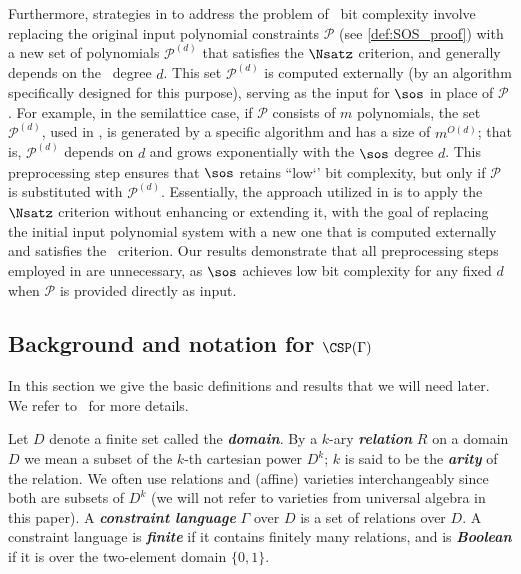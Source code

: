 \documentclass[11pt]{article}
\begin{document}
Furthermore, strategies in \cite{BharathiM21,BulatovRSTOC22,BulatovARXIV21, Mastrolilli21TALG} to address the problem of \sos\ bit complexity involve replacing the original input polynomial constraints \(\mathcal{P}\) (see \cref{def:SOS_proof}) with a new set of polynomials $\mathcal{P}^{(d)}$ that satisfies the \(\Nsatz\) criterion, and generally depends on the \sos\ degree \(d\). This set $\mathcal{P}^{(d)}$ is computed externally (by an algorithm specifically designed for this purpose), serving as the input for \(\sos\) in place of $\mathcal{P}$. For example, in the semilattice case, if $\mathcal{P}$ consists of $m$ polynomials, the set $\mathcal{P}^{(d)}$, used in \cite{BulatovRSTOC22,Mastrolilli21TALG}, is generated by a specific algorithm and has a size of \( m^{O(d)} \); that is, $\mathcal{P}^{(d)}$ depends on \( d \) and grows exponentially with the \(\sos\) degree \( d \). This preprocessing step ensures that \(\sos\) retains ``low`' bit complexity, but only if $\mathcal{P}$ is substituted with $\mathcal{P}^{(d)}$. Essentially, the approach utilized in \cite{BharathiM21,BulatovRSTOC22,BulatovARXIV21, Mastrolilli21TALG} is to apply the \(\Nsatz\) criterion without enhancing or extending it, with the goal of replacing the initial input polynomial system with a new one that is computed externally and satisfies the \Nsatz\ criterion.
%
Our results demonstrate that all preprocessing steps employed in \cite{BharathiM21,BulatovRSTOC22,Mastrolilli21TALG} are unnecessary, as \(\sos\) achieves low bit complexity for any fixed \( d \) when \(\mathcal{P}\) is provided directly as input.



\subsection[Background and notation for CSP's]{Background and notation for \(\CSP(\Gamma)\)}\label{sect:CSP_IMP_background}
In this section we give the basic definitions and results that we will need later.
We refer to~\cite{barto_et_al:DFU:2017:6959,2017dfu7,Chen09, Mastrolilli21TALG, BulatovRSTOC22} for more details.

Let $D$ denote a finite set called the  \textbf{\emph{domain}}.
By a $k$-ary \textbf{\emph{relation}} $R$ on a domain $D$ we mean a subset of the $k$-th cartesian power $D^k$; $k$ is said to be the \textbf{\emph{arity}} of the relation. We often use relations and (affine) varieties interchangeably since both are subsets of $D^k$ (we will not refer to varieties from universal algebra in this paper). A \textbf{\emph{constraint language}} $\Gamma$ over $D$ is a set of relations over $D$. A constraint language is \textbf{\emph{finite}} if it contains finitely many relations, and is \textbf{\emph{Boolean}} if it is over the two-element domain $\{0,1\}$. %
\end{document}
